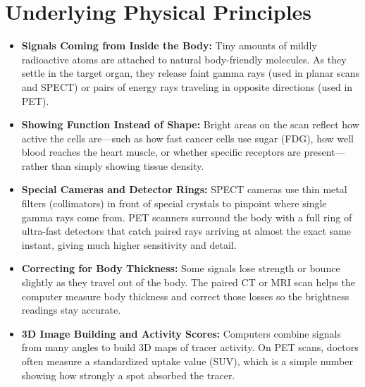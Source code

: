 \section{Underlying Physical Principles}
\begin{itemize}
  \item \textbf{Signals Coming from Inside the Body:} Tiny amounts of mildly radioactive atoms are attached to natural body-friendly molecules. As they settle in the target organ, they release faint gamma rays (used in planar scans and SPECT) or pairs of energy rays traveling in opposite directions (used in PET).
  \item \textbf{Showing Function Instead of Shape:} Bright areas on the scan reflect how active the cells are---such as how fast cancer cells use sugar (FDG), how well blood reaches the heart muscle, or whether specific receptors are present---rather than simply showing tissue density.
  \item \textbf{Special Cameras and Detector Rings:} SPECT cameras use thin metal filters (collimators) in front of special crystals to pinpoint where single gamma rays come from. PET scanners surround the body with a full ring of ultra-fast detectors that catch paired rays arriving at almost the exact same instant, giving much higher sensitivity and detail.
  \item \textbf{Correcting for Body Thickness:} Some signals lose strength or bounce slightly as they travel out of the body. The paired CT or MRI scan helps the computer measure body thickness and correct those losses so the brightness readings stay accurate.
  \item \textbf{3D Image Building and Activity Scores:} Computers combine signals from many angles to build 3D maps of tracer activity. On PET scans, doctors often measure a standardized uptake value (SUV), which is a simple number showing how strongly a spot absorbed the tracer.
\end{itemize}

